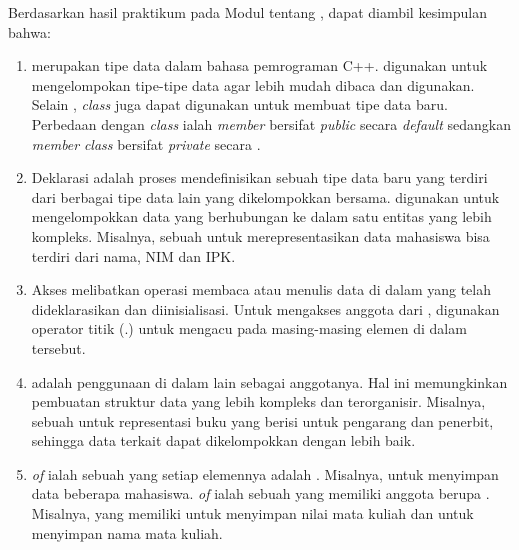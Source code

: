 \documentclass[../main.tex]{subfiles}
\begin{document}
    Berdasarkan hasil praktikum pada Modul {} tentang {\leftmark}, dapat diambil kesimpulan bahwa:
    \begin{enumerate}
        \item {
            {\Struct} merupakan tipe data dalam bahasa pemrograman C++. {\Struct} digunakan untuk mengelompokan tipe-tipe data agar lebih mudah dibaca dan digunakan. Selain {\struct}, \textit{class} juga dapat digunakan untuk membuat tipe data baru. Perbedaan {\struct} dengan \textit{class} ialah \textit{member} {\struct} bersifat \textit{public} secara \textit{default} sedangkan \textit{member} \textit{class} bersifat \textit{private} secara {}.
        }
        \item {
            Deklarasi {\struct} adalah proses mendefinisikan sebuah tipe data baru yang terdiri dari berbagai tipe data lain yang dikelompokkan bersama. {\Struct} digunakan untuk mengelompokkan data yang berhubungan ke dalam satu entitas yang lebih kompleks. Misalnya, sebuah {\struct} untuk merepresentasikan data mahasiswa bisa terdiri dari nama, NIM dan IPK.
        }
        \item {
            Akses {\struct} melibatkan operasi membaca atau menulis data di dalam {\struct} yang telah dideklarasikan dan diinisialisasi. Untuk mengakses anggota dari {\struct}, digunakan operator titik (.) untuk mengacu pada masing-masing elemen di dalam {\struct} tersebut.
        }
        \item {
            {\Nested} {\struct} adalah penggunaan {\struct} di dalam {\struct} lain sebagai anggotanya. Hal ini memungkinkan pembuatan struktur data yang lebih kompleks dan terorganisir. Misalnya, sebuah {\struct} untuk representasi buku yang berisi {\struct} untuk pengarang dan penerbit, sehingga data terkait dapat dikelompokkan dengan lebih baik.
        }
        \item {
            {\sArray} \textit{of} {\struct} ialah sebuah {\sarray} yang setiap elemennya adalah {\struct}. Misalnya, {\sarray} untuk menyimpan data beberapa mahasiswa. {\Struct} \textit{of} {\sarray} ialah sebuah {\struct} yang memiliki anggota berupa {\sarray}. Misalnya, {\struct} yang memiliki {\sarray} untuk menyimpan nilai mata kuliah dan {\sarray} untuk menyimpan nama mata kuliah.
        }
    \end{enumerate}
\end{document}
